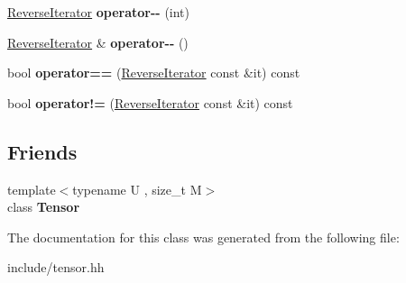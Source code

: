 \begin{DoxyCompactItemize}
\item 
\hyperlink{classtensor_1_1Tensor_1_1ReverseIterator}{Reverse\+Iterator} {\bfseries operator-\/-\/} (int)\hypertarget{classtensor_1_1Tensor_1_1ReverseIterator_a1da099f847ade6824d4b19fed29933d6}{}\label{classtensor_1_1Tensor_1_1ReverseIterator_a1da099f847ade6824d4b19fed29933d6}

\item 
\hyperlink{classtensor_1_1Tensor_1_1ReverseIterator}{Reverse\+Iterator} \& {\bfseries operator-\/-\/} ()\hypertarget{classtensor_1_1Tensor_1_1ReverseIterator_a0c85eaf404ff185adbb6e75d55f8ed87}{}\label{classtensor_1_1Tensor_1_1ReverseIterator_a0c85eaf404ff185adbb6e75d55f8ed87}

\item 
bool {\bfseries operator==} (\hyperlink{classtensor_1_1Tensor_1_1ReverseIterator}{Reverse\+Iterator} const \&it) const \hypertarget{classtensor_1_1Tensor_1_1ReverseIterator_a22d5cb9d295b2ff01bb5fe12b037e7de}{}\label{classtensor_1_1Tensor_1_1ReverseIterator_a22d5cb9d295b2ff01bb5fe12b037e7de}

\item 
bool {\bfseries operator!=} (\hyperlink{classtensor_1_1Tensor_1_1ReverseIterator}{Reverse\+Iterator} const \&it) const \hypertarget{classtensor_1_1Tensor_1_1ReverseIterator_aff1acff1002397f12158b343f2c07473}{}\label{classtensor_1_1Tensor_1_1ReverseIterator_aff1acff1002397f12158b343f2c07473}

\end{DoxyCompactItemize}
\subsection*{Friends}
\begin{DoxyCompactItemize}
\item 
{\footnotesize template$<$typename U , size\+\_\+t M$>$ }\\class {\bfseries Tensor}\hypertarget{classtensor_1_1Tensor_1_1ReverseIterator_af4a07134de1525172d3c60c57e8f1496}{}\label{classtensor_1_1Tensor_1_1ReverseIterator_af4a07134de1525172d3c60c57e8f1496}

\end{DoxyCompactItemize}


The documentation for this class was generated from the following file\+:\begin{DoxyCompactItemize}
\item 
include/tensor.\+hh\end{DoxyCompactItemize}

